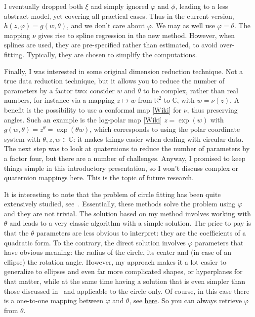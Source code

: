 \documentclass[oneside,10pt]{book}
\begin{document}
I eventually dropped both $\xi$ and simply ignored $\varphi$ and $\phi$, leading to a less abstract model, yet covering all practical cases. 
Thus in the current version, $h(z,\varphi)=g(w,\theta)$, and we don't care about $\varphi$. We may as well use $\varphi=\theta$. The mapping $\nu$ gives rise to spline regression in the new method. However, when splines are used, they are pre-specified rather than estimated, to avoid over-fitting. Typically, they are chosen to simplify the computations.

Finally, I was interested in some original dimension reduction technique. Not a true data reduction technique, but it allows you to reduce the number of parameters by a factor two: consider $w$ and $\theta$ to be complex, rather than real numbers, for instance via a mapping $z \mapsto w$ from $\mathbb{R}^2$ to 
$\mathbb{C}$, with $w=\nu(z)$. A benefit is the possibility to use
 a \textcolor{index}{conformal map} [\href{https://en.wikipedia.org/wiki/Conformal_map}{Wiki}] for $\nu$, thus preserving angles. Such an example is the \textcolor{index}{log-polar map} [\href{https://en.wikipedia.org/wiki/Log-polar_coordinates}{Wiki}] $z=\exp(w)$ with
$g(w,\theta)=z^\theta=\exp(\theta w)$, which corresponds to using the polar coordinate system with $\theta,z,w\in\mathbb{C}$: it makes things easier when dealing with circular data. The next step was to look at quaternions to reduce the number of parameters by a factor four, but there are a number of challenges. Anyway, I promised to keep things simple in this introductory 
 presentation, so I won't discuss complex or quaternion mappings here. This is the topic of future research. 

It is interesting to note that the problem of circle fitting has been quite extensively studied, see~\cite{ieee200y}. Essentially, these
 methods solve the problem using $\varphi$ and they are not trivial. The solution based on my method 
 involves working with $\theta$ and leads to a very classic algorithm with a simple solution. The price to pay is that the $\theta$
 parameters are less obvious to interpret: they are the coefficients of a quadratic form. To the contrary, the direct solution 
 involves $\varphi$ parameters that have obvious meaning: the radius of the circle, its center and (in case of an ellipse) the rotation angle. 
However, my approach makes it a lot easier to generalize to ellipses
 and even far more complicated shapes, or hyperplanes for that matter, while at the same time having a solution that is even simpler than those discussed in~\cite{ieee200y} and applicable to
 the circle only. Of course, in this case there is a one-to-one mapping between $\varphi$ and $\theta$, see 
 \href{https://math.stackexchange.com/questions/1810677/center-and-axis-of-quadratic-surface}{here}. So you can always retrieve
 $\varphi$ from $\theta$. 
\end{document}
